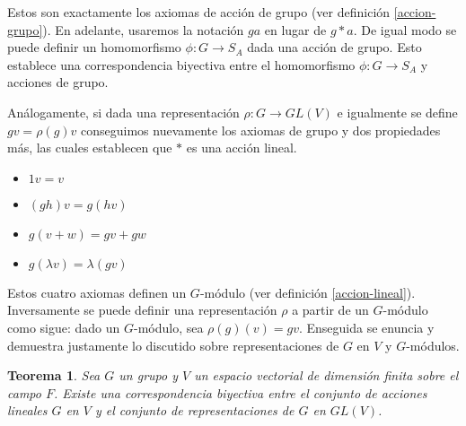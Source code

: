 \documentclass[12pt]{book}
\newtheorem{theorem}{Teorema}[section]
\theoremstyle{definition}
\newcounter{in}
\newcounter{ini}
\begin{document}
Estos son exactamente los axiomas de
acción de grupo (ver definición \ref{accion-grupo}). En adelante,
usaremos la notación $ga$ en lugar de $g*a$. De igual modo se puede
definir un homomorfismo $\phi:G\rightarrow S_{A}$ dada una acción de grupo. Esto establece una
correspondencia biyectiva entre el homomorfismo $\phi:G\rightarrow
S_{A}$ y acciones de grupo.

Análogamente, si dada una representación $\rho:G\rightarrow GL(V)$ e igualmente se define
$gv=\rho(g)v$ conseguimos nuevamente los axiomas de grupo y dos
propiedades más, las cuales establecen que $*$ es una acción lineal.
\begin{itemize}
\item $1v=v$
\item $(gh)v=g(hv)$
\item $g(v+w)=gv+gw$
\item $g(\lambda v)=\lambda(gv)$
\end{itemize}

Estos cuatro axiomas definen un $G$-módulo (ver definición
\ref{accion-lineal}). Inversamente se puede definir una representación
$\rho$ a partir de un $G$-módulo como sigue:
dado un $G$-módulo, sea $\rho(g)(v)=gv$. Enseguida se
enuncia y demuestra justamente lo
discutido sobre representaciones de
$G$ en $V$ y $G$-módulos.

\begin{theorem}
  \label{rep-mod}
  Sea $G$ un grupo y $V$ un espacio vectorial de dimensión finita
  sobre el campo $F$. Existe una correspondencia biyectiva entre el conjunto de acciones
  lineales $G$ en $V$ y el conjunto de representaciones de $G$ en $GL(V)$.
\end{theorem}
\end{document}
